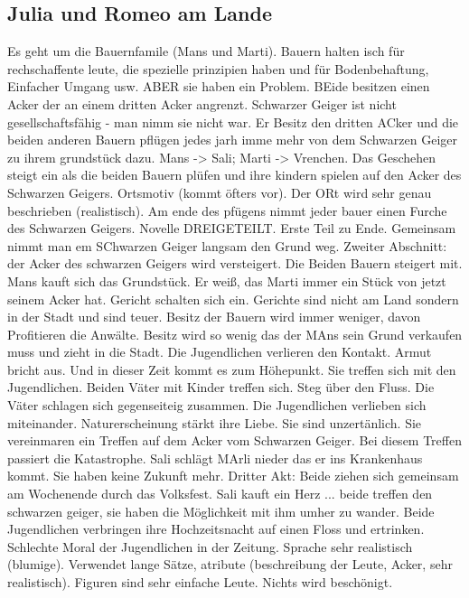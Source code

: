 \documentclass[12pt,a4paper]{article}
\begin{document}
\subsection{Julia und Romeo am Lande}

Es geht um die Bauernfamile (Mans und Marti). Bauern halten isch für rechschaffente leute, die spezielle prinzipien haben und für Bodenbehaftung, Einfacher Umgang usw. ABER sie haben ein Problem. BEide besitzen einen Acker der an einem dritten Acker angrenzt. Schwarzer Geiger ist nicht gesellschaftsfähig - man nimm sie nicht war. Er Besitz den dritten ACker und die beiden anderen Bauern pflügen  jedes jarh imme mehr von dem Schwarzen Geiger zu ihrem grundstück dazu. Mans -> Sali; Marti -> Vrenchen.
\newline
\newline
Das Geschehen steigt ein als die beiden Bauern plüfen und ihre kindern spielen auf den Acker des Schwarzen Geigers. Ortsmotiv (kommt öfters vor). Der ORt wird sehr genau beschrieben (realistisch). Am ende des pfügens nimmt jeder bauer einen Furche des Schwarzen Geigers. 
Novelle DREIGETEILT. Erste Teil zu Ende. Gemeinsam nimmt man em SChwarzen Geiger langsam den Grund weg.
\newline
\newline
Zweiter Abschnitt: der Acker des schwarzen Geigers wird versteigert. Die Beiden Bauern steigert mit. Mans kauft sich das Grundstück. Er weiß, das Marti immer ein Stück von jetzt seinem Acker hat. Gericht schalten sich ein. Gerichte sind nicht am Land sondern in der Stadt und sind teuer. Besitz der Bauern wird immer weniger, davon Profitieren die Anwälte. Besitz wird so wenig das der MAns sein Grund verkaufen muss und zieht in die Stadt. Die Jugendlichen verlieren den Kontakt. Armut bricht aus. Und in dieser Zeit kommt es zum Höhepunkt. Sie treffen sich mit den Jugendlichen. Beiden Väter mit Kinder treffen sich. Steg über den Fluss. Die Väter schlagen sich gegenseiteig zusammen. Die Jugendlichen verlieben sich miteinander. Naturerscheinung stärkt ihre Liebe. Sie sind unzertänlich. Sie vereinmaren ein Treffen auf dem Acker vom Schwarzen Geiger.  Bei diesem Treffen passiert die Katastrophe. Sali schlägt MArli nieder das er ins Krankenhaus kommt. Sie haben keine Zukunft mehr. Dritter Akt: Beide ziehen sich gemeinsam am Wochenende durch das Volksfest. Sali kauft ein Herz ... beide treffen den schwarzen geiger, sie haben die Möglichkeit mit ihm umher zu wander. Beide Jugendlichen verbringen ihre Hochzeitsnacht auf einen Floss und ertrinken. Schlechte Moral der Jugendlichen in der Zeitung. Sprache sehr realistisch (blumige). Verwendet lange Sätze, atribute (beschreibung der Leute, Acker, sehr realistisch). Figuren sind sehr einfache Leute. Nichts wird beschönigt.
\end{document}
